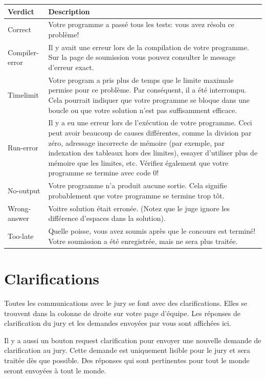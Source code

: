 \begin{center}
\begin{longtable}{|l|p{12.5cm}|}
\hline
\textbf{Verdict} &
\textbf{Description}\\\hline
Correct &
Votre programme a passé tous les tests:
vous avez résolu ce problème!\\\hline
Compiler-error &
Il y avait une erreur lors de la compilation de votre programme. 
Sur la page de soumission vous pouvez 
consulter le message d'erreur exact.
\\\hline
Timelimit &
Votre program a pris plus de temps que le limite maximale permise
pour ce problème. Par conséquent, il a été interrompu. 
Cela pourrait indiquer que votre programme se bloque 
dans une boucle ou que votre 
solution n'est pas suffisamment efficace.\\\hline
Run-error &
Il y a eu une erreur lors de l'exécution de votre programme. Ceci
peut avoir beaucoup de causes différentes, 
comme la division par zéro, adressage incorrecte de mémoire 
(par exemple, par indexation des tableaux hors des limites),
essayer d'utiliser plus de mémoire que les limites, etc.
Vérifiez également que votre programme se termine avec code 0!\\\hline
No-output&
Votre programme n'a produit aucune sortie. Cela signifie 
probablement que votre programme se termine trop tôt.\\\hline
Wrong-answer&
Voitre solution était erronée. (Notez que le juge ignore les différence
d'espaces dans la solution).\\\hline
Too-late&
Quelle poisse, vous avez soumis après que 
le concours est terminé! Votre soumission a été enregistrée, 
mais ne sera plus traitée.\\\hline
\end{longtable}
\end{center}

\bigskip

\section{Clarifications}
Toutes les communications avec le jury se font 
avec des clarifications. 
Elles se trouvent dans la colonne de droite 
sur votre page d'équipe. Les réponses de clarification 
du jury et les demandes envoyées par vous sont affichées ici.

Il y a aussi un bouton \og request clarification\fg{} pour envoyer une nouvelle demande
de clarification au jury. Cette demande est uniquement lisible 
pour le jury et sera traitée dès que possible. 
Des réponses qui sont pertinentes pour tout le monde 
seront envoyées à tout le monde.

